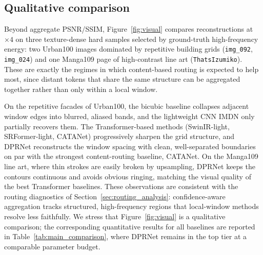 \subsection{Qualitative comparison}
\label{sec:visual}

Beyond aggregate PSNR/SSIM, Figure~\ref{fig:visual} compares reconstructions at
$\times4$ on three texture-dense hard samples selected by ground-truth
high-frequency energy: two Urban100 images dominated by repetitive building
grids (\texttt{img\_092}, \texttt{img\_024}) and one Manga109 page of
high-contrast line art (\texttt{ThatsIzumiko}). These are exactly the regimes in
which content-based routing is expected to help most, since distant tokens that
share the same structure can be aggregated together rather than only within a
local window.

On the repetitive facades of Urban100, the bicubic baseline collapses adjacent
window edges into blurred, aliased bands, and the lightweight CNN IMDN only
partially recovers them. The Transformer-based methods (SwinIR-light,
SRFormer-light, CATANet) progressively sharpen the grid structure, and DPRNet
reconstructs the window spacing with clean, well-separated boundaries on par
with the strongest content-routing baseline, CATANet. On the Manga109 line art,
where thin strokes are easily broken by upsampling, DPRNet keeps the contours
continuous and avoids obvious ringing, matching the visual quality of the best
Transformer baselines. These observations are consistent with the routing
diagnostics of Section~\ref{sec:routing_analysis}: confidence-aware aggregation
tracks structured, high-frequency regions that local-window methods resolve less
faithfully. We stress that Figure~\ref{fig:visual} is a qualitative comparison;
the corresponding quantitative results for all baselines are reported in
Table~\ref{tab:main_comparison}, where DPRNet remains in the top tier at a
comparable parameter budget.
